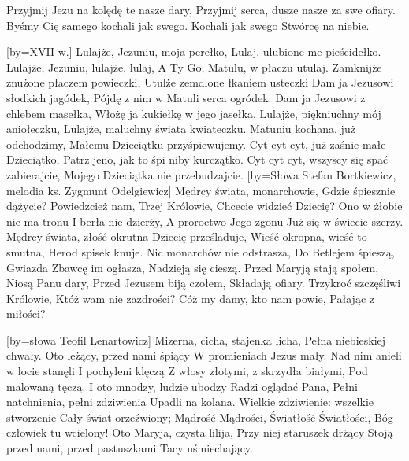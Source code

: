 \beginverse
Przyjmij Jezu na kolędę te nasze dary,
Przyjmij serca, dusze nasze za swe ofiary.
Byśmy Cię samego kochali jak swego.
Kochali jak swego Stwórcę na niebie.
\endverse
\endsong


[by={XVII w.}]
\beginverse
    Lulajże, Jezuniu, moja perełko,
    Lulaj, ulubione me pieścidełko.
\endverse
\beginchorus
        Lulajże, Jezuniu, lulajże, lulaj,
        A Ty Go, Matulu, w płaczu utulaj.
\endchorus
\beginverse
    Zamknijże znużone płaczem powieczki,
    Utulże zemdlone łkaniem usteczki
\endverse
\beginverse
    Dam ja Jezusowi słodkich jagódek,
    Pójdę z nim w Matuli serca ogródek.
\endverse
\beginverse
    Dam ja Jezusowi z chlebem masełka,
    Włożę ja kukiełkę w jego jasełka.
\endverse
\beginverse
    Lulajże, piękniuchny mój aniołeczku,
    Lulajże, maluchny świata kwiateczku.
\endverse
\beginverse
    Matuniu kochana, już odchodzimy,
    Małemu Dzieciątku przyśpiewujemy.
\endverse
\beginverse
    Cyt cyt cyt, już zaśnie małe Dzieciątko,
    Patrz jeno, jak to śpi niby kurczątko.
\endverse
\beginverse
    Cyt cyt cyt, wszyscy się spać zabierajcie,
    Mojego Dzieciątka nie przebudzajcie.
\endverse
\endsong
[by={Słowa Stefan Bortkiewicz, melodia ks. Zygmunt Odelgiewicz}]
\beginverse
    Mędrcy świata, monarchowie,
    Gdzie śpiesznie dążycie?
    Powiedzcież nam, Trzej Królowie,
    Chcecie widzieć Dziecię?
\endverse
\beginchorus
    Ono w żłobie nie ma tronu
    I berła nie dzierży,
    A proroctwo Jego zgonu
    Już się w świecie szerzy.
\endchorus
\beginverse
    Mędrcy świata, złość okrutna
    Dziecię prześladuje,
    Wieść okropna, wieść to smutna,
    Herod spisek knuje.
\endverse
\beginchorus
    Nic monarchów nie odstrasza,
    Do Betlejem śpieszą,
    Gwiazda Zbawcę im ogłasza,
    Nadzieją się cieszą.
\endchorus
\beginverse
    Przed Maryją stają społem,
    Niosą Panu dary,
    Przed Jezusem biją czołem,
    Składają ofiary.
\endverse
\beginchorus
    Trzykroć szczęśliwi Królowie,
    Któż wam nie zazdrości?
    Cóż my damy, kto nam powie,
    Pałając z miłości?
\endchorus
\endsong


[by={słowa Teofil Lenartowicz}]
\beginverse
Mizerna, cicha, stajenka licha,
Pełna niebieskiej chwały.
Oto leżący, przed nami śpiący
W promieniach Jezus mały.
\endverse
\beginverse
Nad nim anieli w locie stanęli
I pochyleni klęczą
Z włosy złotymi, z skrzydła białymi,
Pod malowaną tęczą.
\endverse
\beginverse
I oto mnodzy, ludzie ubodzy
Radzi oglądać Pana,
Pełni natchnienia, pełni zdziwienia
Upadli na kolana.
\endverse
\beginverse
Wielkie zdziwienie: wszelkie stworzenie
Cały świat orzeźwiony;
Mądrość Mądrości, Światłość Światłości,
Bóg - człowiek tu wcielony!
\endverse
\beginverse
Oto Maryja, czysta lilija,
Przy niej staruszek drżący
Stoją przed nami, przed pastuszkami
Tacy uśmiechający.
\endverse
\endsong

